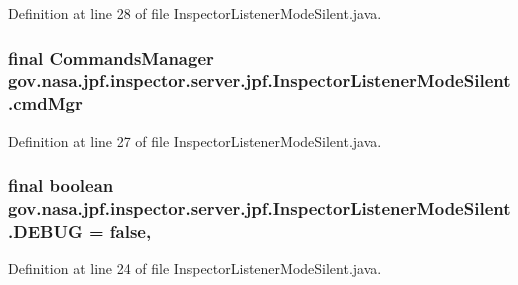 Definition at line 28 of file Inspector\+Listener\+Mode\+Silent.\+java.

\subsubsection[{\texorpdfstring{cmd\+Mgr}{cmdMgr}}]{\setlength{\rightskip}{0pt plus 5cm}final {\bf Commands\+Manager} gov.\+nasa.\+jpf.\+inspector.\+server.\+jpf.\+Inspector\+Listener\+Mode\+Silent.\+cmd\+Mgr\hspace{0.3cm}{\ttfamily [private]}}\hypertarget{classgov_1_1nasa_1_1jpf_1_1inspector_1_1server_1_1jpf_1_1_inspector_listener_mode_silent_a47e70d23ee173ebd1164aed4b9c6c50d}{}\label{classgov_1_1nasa_1_1jpf_1_1inspector_1_1server_1_1jpf_1_1_inspector_listener_mode_silent_a47e70d23ee173ebd1164aed4b9c6c50d}


Definition at line 27 of file Inspector\+Listener\+Mode\+Silent.\+java.

\subsubsection[{\texorpdfstring{D\+E\+B\+UG}{DEBUG}}]{\setlength{\rightskip}{0pt plus 5cm}final boolean gov.\+nasa.\+jpf.\+inspector.\+server.\+jpf.\+Inspector\+Listener\+Mode\+Silent.\+D\+E\+B\+UG = false\hspace{0.3cm}{\ttfamily [static]}, {\ttfamily [private]}}\hypertarget{classgov_1_1nasa_1_1jpf_1_1inspector_1_1server_1_1jpf_1_1_inspector_listener_mode_silent_aace7f1715e5614ddeed907df30ba9949}{}\label{classgov_1_1nasa_1_1jpf_1_1inspector_1_1server_1_1jpf_1_1_inspector_listener_mode_silent_aace7f1715e5614ddeed907df30ba9949}


Definition at line 24 of file Inspector\+Listener\+Mode\+Silent.\+java.

